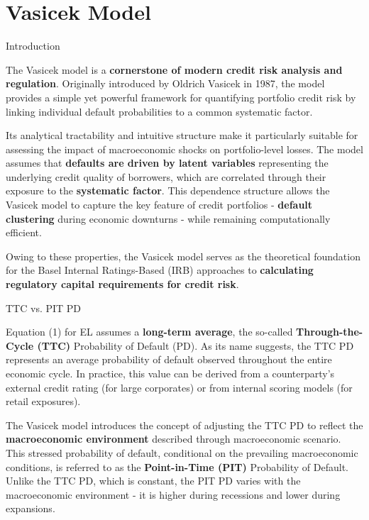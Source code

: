 \documentclass{beamer}
\begin{document}
\section{Vasicek Model}

\begin{frame}{Introduction}
\justifying
\small

The Vasicek model is a \textbf{cornerstone of modern credit risk analysis and regulation}. Originally introduced by Oldrich Vasicek in 1987, the model provides a simple yet powerful framework for quantifying portfolio credit risk by linking individual default probabilities to a common systematic factor.

\medskip

Its analytical tractability and intuitive structure make it particularly suitable for assessing the impact of macroeconomic shocks on portfolio-level losses. The model assumes that \textbf{defaults are driven by latent variables} representing the underlying credit quality of borrowers, which are correlated through their exposure to the \textbf{systematic factor}. This dependence structure allows the Vasicek model to capture the key feature of credit portfolios - \textbf{default clustering} during economic downturns - while remaining computationally efficient.

\medskip

Owing to these properties, the Vasicek model serves as the theoretical foundation for the Basel Internal Ratings-Based (IRB) approaches to \textbf{calculating regulatory capital requirements for credit risk}.

\end{frame}

\begin{frame}{TTC vs. PIT PD}
\justifying
\small

Equation (1) for EL assumes a \textbf{long-term average}, the so-called \textbf{Through-the-Cycle (TTC)} Probability of Default (PD). As its name suggests, the TTC PD represents an average probability of default observed throughout the entire economic cycle. In practice, this value can be derived from a counterparty's external credit rating (for large corporates) or from internal scoring models (for retail exposures).

\medskip

The Vasicek model introduces the concept of adjusting the TTC PD to reflect the \textbf{macroeconomic environment} described through macroeconomic scenario. This stressed probability of default, conditional on the prevailing macroeconomic conditions, is referred to as the \textbf{Point-in-Time (PIT)} Probability of Default. Unlike the TTC PD, which is constant, the PIT PD varies with the macroeconomic environment - it is higher during recessions and lower during expansions.

\end{frame}
\end{document}
